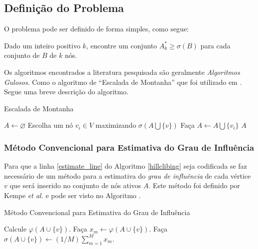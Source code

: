 \documentclass{acm_proc_article-sp}
\begin{document}
\subsection{Definição do Problema}
O problema pode ser definido de forma simples, como segue: 

\begin{definicao}
Dado um inteiro positivo $k$, encontre um conjunto $A^{*}_{k} \geq \sigma(B)$ para cada conjunto de $B$ de $k$ nós.
\end{definicao}

Os algoritmos encontrados a literatura pesquisada são geralmente \textit{Algoritmos Gulosos}. Como o algoritmo
de ``Escalada de Montanha'' que foi utilizado em \cite{kimura:2007}. Segue uma breve descrição do algoritmo.

\begin{algorithm}[H]
\caption{Escalada de Montanha}\label{hillclibing}
\begin{algorithmic}[1]
	\State $A \gets \varnothing$
		\State Escolha um nó $v_{i} \in V$ maximizando $\sigma(A \bigcup \{v\})$ \label{estimate_line}  \State Faça $A \gets A \bigcup \{v_{i}\}$
	\EndFor
	\State \Return $A$
\EndProcedure
\end{algorithmic}
\end{algorithm}

\subsubsection{Método Convencional para Estimativa do Grau de Influência}\label{sec-convencional}
Para que a linha \ref{estimate_line} do Algoritmo \ref{hillclibing} seja codificada se faz necessário de um método
para a estimativa do \textit{grau de influência} de cada vértice $v$ que será inserido no conjunto de nós ativos
$A$. Este método foi definido por Kempe \textit{et al.}\cite{kempe:2003} e pode ser visto no Algoritmo .

\begin{algorithm}[H]
\caption{Método Convencional para Estimativa do Grau de Influência}\label{convencional}
\begin{algorithmic}[1]
		\State Calcule $\varphi(A \cup \{v\})$. 		
		\State Faça $x_{m} \gets \varphi(A \cup \{v\})$.
	\EndFor
	\State Faça $\sigma(A \cup \{v\}) \gets (1/M)\sum^{M}_{m=1} x_{m}$.
\EndProcedure
\end{algorithmic}
\end{algorithm}
\end{document}
